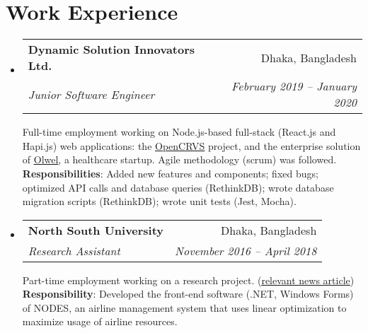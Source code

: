 \documentclass[letter-paper,10pt]{article}
\makeatletter
\newcommand{\resumeItem}[2]{
  \item\small{
    \textbf{#1}{: #2 \vspace{-2pt}}
  }
}
\newcommand{\resumeSubheading}[4]{
  \vspace{-1pt}\item
    \begin{tabular*}{0.97\textwidth}[t]{l@{\extracolsep{\fill}}r}
      \textbf{#1} & #2 \\
      \textit{#3} & \textit{ #4} \\
    \end{tabular*}\vspace{-5pt}
}
\newcommand{\resumeSubSubheading}[2]{
    \begin{tabular*}{0.97\textwidth}{l@{\extracolsep{\fill}}r}
      \textit{\small#1} & \textit{\small #2} \\
    \end{tabular*}\vspace{-5pt}
}
\newcommand{\resumeSubHeadingListStart}{\begin{itemize}[leftmargin=*]}
\newcommand{\resumeSubHeadingListEnd}{\end{itemize}}
\newcommand{\resumeItemListStart}{\begin{itemize}}
\newcommand{\resumeItemListEnd}{\end{itemize}\vspace{-5pt}}
\makeatother
\begin{document}
\section{Work Experience}
  \resumeSubHeadingListStart

    \resumeSubheading
      {Dynamic Solution Innovators Ltd.}{Dhaka, Bangladesh}
      {Junior Software Engineer}{February 2019 -- January 2020}
      
      Full-time employment working on Node.js-based full-stack (React.js and Hapi.js) web applications: the \href{https://opencrvs.org}{\underline{OpenCRVS}} project, and the enterprise solution of \href{https://olwel.com}{\underline{Olwel}}, a healthcare startup. Agile methodology (scrum) was followed.
      \newline
      \textbf{Responsibilities}: Added new features and components; fixed bugs; optimized API calls and database queries (RethinkDB); wrote database migration scripts (RethinkDB); wrote unit tests (Jest, Mocha).\newline [View my commits for OpenCRVS on GitHub \href{https://github.com/opencrvs/opencrvs-core/commits?author=maacpiash}{\underline{here}}]
      

    \resumeSubheading
      {North South University}{Dhaka, Bangladesh}
      {Research Assistant}{November 2016 -- April 2018}
      
      Part-time employment working on a research project. (\href{http://www.ipsnews.net/2017/05/flying-green-in-bangladesh/}{\underline{relevant news article}})
      \newline
      \textbf{Responsibility}: Developed the front-end software (.NET, Windows Forms) of NODES, an airline management system that uses linear optimization to maximize usage of airline resources.
     
  \resumeSubHeadingListEnd
  
\end{document}
